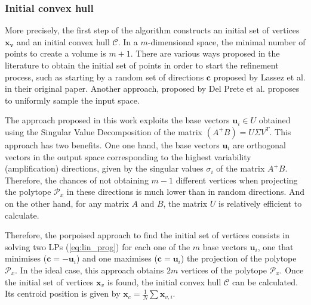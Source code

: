 \subsubsection{Initial convex hull}More precisely, the first step of the algorithm constructs an initial set of vertices $\bm{x_v}$ and an initial convex hull $\mathcal{C}$. In a $m$-dimensional space, the minimal number of points to create a volume is $m\!+\!1$.  There are various ways proposed in the literature to obtain the initial set of points in order to start the refinement process, such as starting by a random set of directions $\bm{c}$ proposed by Lassez et al. \cite{lassez1992quantifier} in their original paper. Another approach, proposed by Del Prete et al. \cite{DelPrete2016Fast} proposes to uniformly sample the input space.

The approach proposed in this work exploits the base vectors $\bm{u}_i\in U$ obtained using the Singular Value Decomposition of the matrix $(A^+B) = U\Sigma V^T$. This approach has two benefits. One one hand, the base vectors $\bm{u}_i$ are orthogonal vectors in the output space corresponding to the 
highest variability (amplification) directions, given by the singular values $\sigma_i$ of the matrix $A^+B$.
Therefore, the chances of not obtaining $m-1$ different vertices when projecting the polytope $\mathcal{P}_x$ in these directions is much lower than in random directions. And on the other hand, for any matrix $A$ and $B$, the matrix $U$ is relatively efficient to calculate.

Therefore, the porpoised approach to find the initial set of vertices consists in solving two LPs (\ref{eq:lin_prog}) for each one of the $m$ base vectors $\bm{u}_i$, one that minimises ($\bm{c} = -\bm{u}_i$) and one maximises ($\bm{c} = \bm{u}_i$) the projection of the polytope $\mathcal{P}_x$. In the ideal case, this approach obtains $2m$ vertices of the polytope $\mathcal{P}_x$. Once the initial set of vertices $\bm{x}_v$ is found, the initial convex hull $\mathcal{C}$ can be calculated. Its centroid position is given by $\bm{x}_c\!=\!\frac{1}{N}\!\sum\bm{x}_{v,i}$. 



